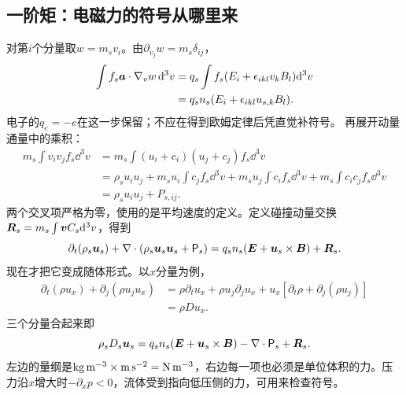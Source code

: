 \subsection{一阶矩：电磁力的符号从哪里来}
对第$i$个分量取$w=m_sv_i$。由$\partial_{v_j}w=m_s\delta_{ij}$，
\begin{align}
 \int f_s\bm{a}\cdot\nabla_vw\,\mathrm d^3v
 &=q_s\int f_s(E_i+\epsilon_{ikl}v_kB_l)\mathrm d^3v\\
 &=q_sn_s(E_i+\epsilon_{ikl}u_{s,k}B_l).
\end{align}
电子的$q_e=-e$在这一步保留；不应在得到欧姆定律后凭直觉补符号。
再展开动量通量中的乘积：
\begin{align}
 m_s\int v_iv_jf_s\dd^3v
 &=m_s\int(u_i+c_i)(u_j+c_j)f_s\dd^3v\\
 &=\rho_su_iu_j+
 m_su_i\int c_jf_s\dd^3v+
 m_su_j\int c_if_s\dd^3v+
 m_s\int c_ic_jf_s\dd^3v\\
 &=\rho_su_iu_j+P_{s,ij}.
\end{align}
两个交叉项严格为零，使用的是平均速度的定义。定义碰撞动量交换$\bm{R}_s=m_s\int\bm{v}C_s\mathrm d^3v$，得到
\begin{equation}
 \partial_t(\rho_s\bm{u}_s)+
 \nabla\cdot(\rho_s\bm{u}_s\bm{u}_s+\mathsf P_s)
 =q_sn_s(\bm{E}+\bm{u}_s\times\bm{B})+\bm{R}_s.
 \label{eq:momentum}
\end{equation}
现在才把它变成随体形式。以$x$分量为例，
\begin{align}
 \partial_t(\rho u_x)+\partial_j(\rho u_ju_x)
 &=\rho\partial_tu_x+\rho u_j\partial_ju_x
   +u_x[\partial_t\rho+\partial_j(\rho u_j)]\\
 &=\rho Du_x.
\end{align}
三个分量合起来即
\begin{equation}
 \rho_sD_s\bm{u}_s=q_sn_s(\bm{E}+\bm{u}_s\times\bm{B})
                  -\nabla\cdot\mathsf P_s+\bm{R}_s.
 \label{eq:speciesmom}
\end{equation}
左边的量纲是$ {\rm kg\,m^{-3}}\times{\rm m\,s^{-2}}={\rm N\,m^{-3}}$，右边每一项也必须是单位体积的力。压力沿$x$增大时$-\partial_xp<0$，流体受到指向低压侧的力，可用来检查符号。

